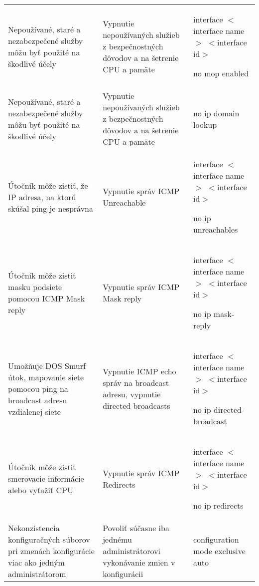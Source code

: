 \begin{longtable}[!htbp]{|L{10em}L{10em}>{\selectfont}L{34em}|}
	
	
	
	 Nepoužívané, staré a nezabezpečené služby môžu byť použité na škodlivé účely	&Vypnutie nepoužívaných služieb z bezpečnostných dôvodov a na šetrenie CPU a pamäte 	&interface $<$interface name$>$ $<$interface id$>$
	
	\hspace{0.5em} no mop enabled\\
	
	
	
	Nepoužívané, staré a nezabezpečené služby môžu byť použité na škodlivé účely	&Vypnutie nepoužívaných služieb z bezpečnostných dôvodov a na šetrenie CPU a pamäte 	&no ip domain lookup\\
	
	
	
	 Útočník môže zistiť, že IP adresa, na ktorú skúšal ping je nesprávna	&Vypnutie správ ICMP Unreachable	&interface $<$interface name$>$ $<$interface id$>$
	
	\hspace{0.5em}no ip unreachables\\
	
	
	
	
	Útočník môže zistiť masku podsiete pomocou ICMP Mask reply	&Vypnutie správ ICMP Mask reply	&interface $<$interface name$>$ $<$interface id$>$
	
	\hspace{0.5em}no ip mask-reply\\
	
	
	
	
	 Umožňuje DOS Smurf útok, mapovanie siete pomocou ping na broadcast adresu vzdialenej siete	&Vypnutie ICMP echo správ na broadcast adresu, vypnutie directed broadcasts	&interface $<$interface name$>$ $<$interface id$>$
	
	\hspace{0.5em}no ip directed-broadcast\\
	
	
	
	
	Útočník môže zistiť smerovacie informácie alebo vyťažiť CPU	&Vypnutie správ ICMP Redirects	&interface $<$interface name$>$ $<$interface id$>$
	
	\hspace{0.5em}no ip redirects\\
	
	
	
	 Nekonzistencia konfiguračných súborov pri zmenách konfigurácie viac ako jedným administrátorom	&Povoliť súčasne iba jednému administrátorovi vykonávanie zmien v konfigurácii	&configuration mode exclusive auto\\
	

\end{longtable}
